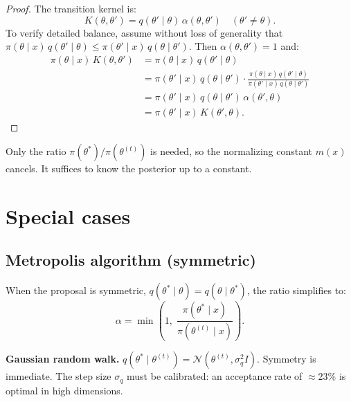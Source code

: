\begin{proof}
The transition kernel is:
\[
  K(\theta, \theta') = q(\theta' \mid \theta)\,\alpha(\theta, \theta')
  \quad (\theta' \neq \theta).
\]
To verify detailed balance, assume without loss of generality that
$\pi(\theta \mid x)\,q(\theta' \mid \theta) \leq
\pi(\theta' \mid x)\,q(\theta \mid \theta')$. Then
$\alpha(\theta, \theta') = 1$ and:
\begin{align*}
  \pi(\theta \mid x)\,K(\theta, \theta')
  &= \pi(\theta \mid x)\,q(\theta' \mid \theta) \\
  &= \pi(\theta' \mid x)\,q(\theta \mid \theta')
  \cdot \frac{\pi(\theta \mid x)\,q(\theta' \mid \theta)}
             {\pi(\theta' \mid x)\,q(\theta \mid \theta')} \\
  &= \pi(\theta' \mid x)\,q(\theta \mid \theta')\,\alpha(\theta', \theta) \\
  &= \pi(\theta' \mid x)\,K(\theta', \theta).
\end{align*}
\end{proof}

\begin{remark}
Only the ratio $\pi(\theta^*)/\pi(\theta^{(t)})$ is needed, so the
normalizing constant $m(x)$ cancels. It suffices to know the posterior
up to a constant.
\end{remark}

\section{Special cases}

\subsection{Metropolis algorithm (symmetric)}

\begin{definition}[Metropolis]
When the proposal is symmetric,
$q(\theta^* \mid \theta) = q(\theta \mid \theta^*)$, the ratio
simplifies to:
\[
  \alpha = \min\!\left(1,\; \frac{\pi(\theta^* \mid x)}{\pi(\theta^{(t)} \mid x)}\right).
\]
\end{definition}

\begin{example}
\textbf{Gaussian random walk.}
$q(\theta^* \mid \theta^{(t)}) = \mathcal{N}(\theta^{(t)}, \sigma_q^2 I)$.
Symmetry is immediate. The step size $\sigma_q$ must be calibrated: an
acceptance rate of $\approx 23\%$ is optimal in high dimensions.
\end{example}

